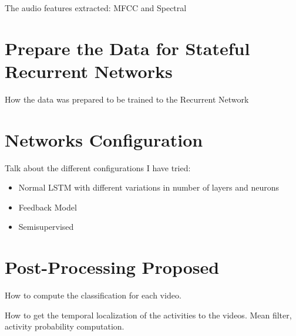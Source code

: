 The audio features extracted: MFCC and Spectral

\section{Prepare the Data for Stateful Recurrent Networks}

How the data was prepared to be trained to the Recurrent Network

\section{Networks Configuration}

Talk about the different configurations I have tried:
\begin{itemize}
    \item Normal LSTM with different variations in number of layers and neurons
    \item Feedback Model
    \item Semisupervised
\end{itemize}

\section{Post-Processing Proposed}

How to compute the classification for each video.

How to get the temporal localization of the activities to the videos.
Mean filter, activity probability computation.
